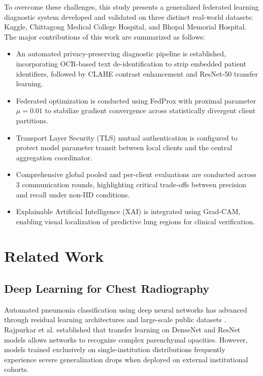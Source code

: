 \documentclass[journal]{IEEEtran}
\begin{document}
To overcome these challenges, this study presents a generalized federated learning diagnostic system developed and validated on three distinct real-world datasets: Kaggle, Chittagong Medical College Hospital, and Bhopal Memorial Hospital. The major contributions of this work are summarized as follows:
\begin{itemize}
    \item An automated privacy-preserving diagnostic pipeline is established, incorporating OCR-based text de-identification to strip embedded patient identifiers, followed by CLAHE contrast enhancement and ResNet-50 transfer learning.
    \item Federated optimization is conducted using FedProx with proximal parameter $\mu = 0.01$ to stabilize gradient convergence across statistically divergent client partitions.
    \item Transport Layer Security (TLS) mutual authentication is configured to protect model parameter transit between local clients and the central aggregation coordinator.
    \item Comprehensive global pooled and per-client evaluations are conducted across 3 communication rounds, highlighting critical trade-offs between precision and recall under non-IID conditions.
    \item Explainable Artificial Intelligence (XAI) is integrated using Grad-CAM, enabling visual localization of predictive lung regions for clinical verification.
\end{itemize}

\section{Related Work}
\subsection{Deep Learning for Chest Radiography}
Automated pneumonia classification using deep neural networks has advanced through residual learning architectures \cite{he2016deep} and large-scale public datasets \cite{wang2017chestxray8, irvin2019chexpert}. Rajpurkar et al. \cite{rajpurkar2017chexnet} established that transfer learning on DenseNet and ResNet models allows networks to recognize complex parenchymal opacities. However, models trained exclusively on single-institution distributions frequently experience severe generalization drops when deployed on external institutional cohorts.
\end{document}
